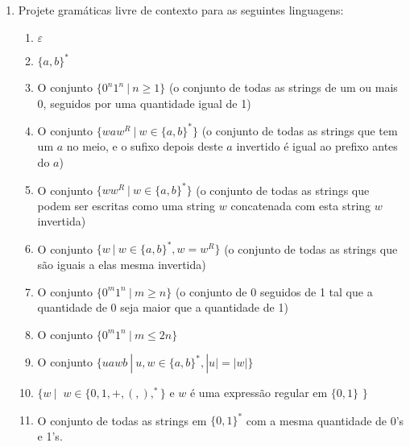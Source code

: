 \documentclass[12pt]{article}
\def\ve{\varepsilon}
\begin{document}
\begin{enumerate}



\item Projete gramáticas livre de contexto para as seguintes linguagens:

\begin{enumerate}

\item $\ve$

\item $\{a,b\}^*$

\item O conjunto $\{0^n1^n~|~n\geq 1\}$ (o conjunto de todas as strings de um ou mais 0, seguidos por uma quantidade igual de 1)

\item O conjunto $\{waw^R~|~w\in \{a,b\}^*\}$ (o conjunto de todas as strings que tem um $a$ no meio, e o sufixo depois deste $a$ invertido é igual ao prefixo antes do $a$)

\item O conjunto $\{ww^R~|~w\in \{a,b\}^*\}$ (o conjunto de todas as strings que podem ser escritas como uma string $w$ concatenada com esta string $w$ invertida)

\item O conjunto $\{w~|~w\in \{a,b\}^*, w = w^R\}$ (o conjunto de todas as strings que são iguais a elas mesma invertida)

\item O conjunto $\{0^m1^n~|~m\geq n\}$ (o conjunto de 0 seguidos de 1 tal que a quantidade de 0 seja maior que a quantidade de 1)

\item O conjunto $\{0^m1^n~|~m\leq 2n\}$ 

\item O conjunto $\{uawb~|~u,w\in \{a,b\}^*, |u| = |w|\}$ 

\item $\{w~|~$ $w\in \{0,1,+,(,),^*\}$ e $w$ é uma expressão regular em $\{0,1\}$ $\}$

\item O conjunto de todas as strings em $\{0,1\}^*$ com a mesma quantidade de 0's e 1's.


\end{enumerate}



\end{enumerate}
\end{document}
